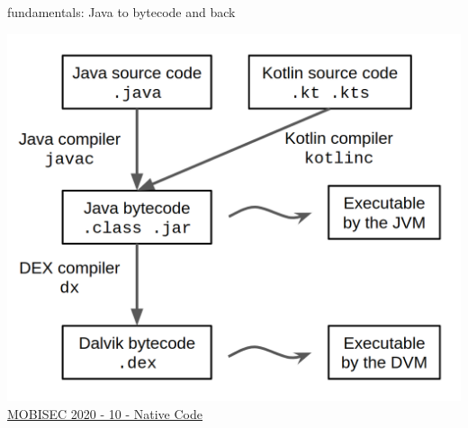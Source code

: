 \documentclass{beamer}
\begin{document}
\begin{frame}{fundamentals: Java to bytecode and back}

    \centering \includegraphics[scale=0.2]{java-to-dex.png}\\
    \href{https://docs.google.com/presentation/d/14nid9QJrSRUd4T_48KZMhWqKT_UdLg7EM-RH0HFQYdM}{MOBISEC 2020 - 10 - Native Code}

\end{frame}






\end{document}
